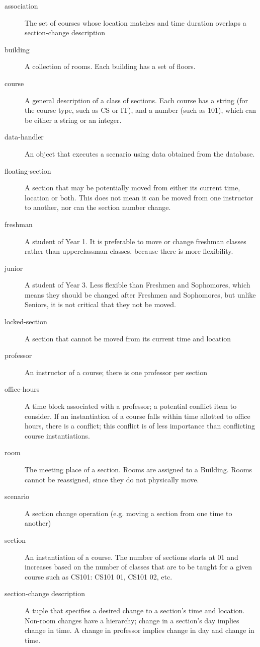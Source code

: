 \begin{description}
  \item[association] The set of courses whose location matches and time duration overlaps a section-change description
  \item[building] A collection of rooms.  Each building has a set of floors.
  \item[course] A general description of a class of sections.  Each course has a string (for the course type, such as CS or IT), and a number (such as 101), which can be either a string or an integer.
  \item[data-handler] An object that executes a scenario using data obtained from the database.  
  \item[floating-section] A section that may be potentially moved from either its current time, location or both.   This does not mean it can be moved from one instructor to another, nor can the section number change.
  \item[freshman] A student of Year 1.  It is preferable to move or change freshman classes rather than upperclassman classes, because there is more flexibility.
  \item[junior] A student of Year 3.  Less flexible than Freshmen and Sophomores, which means they should be changed after Freshmen and Sophomores, but unlike Seniors, it is not critical that they not be moved.
  \item[locked-section] A section that cannot be moved from its current time and location
  \item[professor] An instructor of a course; there is one professor per section
  \item[office-hours] A time block associated with a professor; a potential conflict item to consider.  If an instantiation of a course falls within time allotted to office hours, there is a conflict; this conflict is of less importance than conflicting course instantiations.
  \item[room] The meeting place of a section. Rooms are assigned to a Building.  Rooms cannot be reassigned, since they do not physically move.
  \item[scenario] A section change operation (e.g. moving a section from one time to another)
  \item[section] An instantiation of a course.  The number of sections starts at 01 and increases based on the number of classes that are to be taught for a given course such as CS101: CS101 01, CS101 02, etc.
  \item[section-change description] A tuple that specifies a desired change to a section's time and location.  Non-room changes have a hierarchy; change in a section's day implies change in time.  A change in professor implies change in day and change in time.

\end{description}
